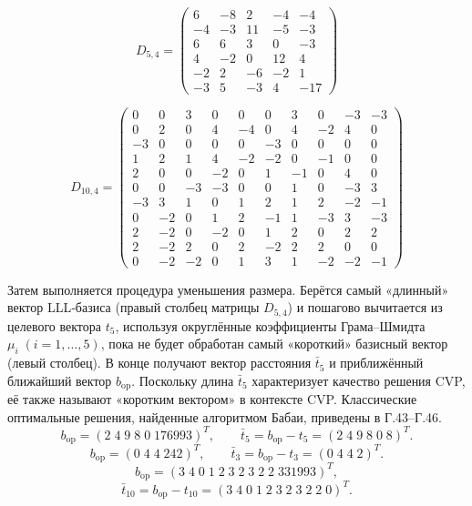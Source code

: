 \begin{equation}
D_{5,4} =
\begin{pmatrix}
  6 & -8 &  2 & -4 & -4 \\
 -4 & -3 & 11 & -5 & -3 \\
  6 &  6 &  3 &  0 & -3 \\
  4 & -2 &  0 & 12 &  4 \\
 -2 &  2 & -6 & -2 &  1 \\
 -3 &  5 & -3 &  4 & -17
\end{pmatrix}
\end{equation}

\begin{equation}
D_{10,4} =
\begin{pmatrix}
 0 &  0 &  3 &  0 &  0 &  0 &  3 &  0 & -3 & -3 \\
 0 &  2 &  0 &  4 & -4 &  0 &  4 & -2 &  4 &  0 \\
-3 &  0 &  0 &  0 &  0 & -3 &  0 &  0 &  0 &  0 \\
 1 &  2 &  1 &  4 & -2 & -2 &  0 & -1 &  0 &  0 \\
 2 &  0 &  0 & -2 &  0 &  1 & -1 &  0 &  4 &  0 \\
 0 &  0 & -3 & -3 &  0 &  0 &  1 &  0 & -3 &  3 \\
-3 &  3 &  1 &  0 &  1 &  2 &  1 &  2 & -2 & -1 \\
 0 & -2 &  0 &  1 &  2 & -1 &  1 & -3 &  3 & -3 \\
 2 & -2 &  0 & -2 &  0 &  1 &  2 &  0 &  2 &  2 \\
 2 & -2 &  2 &  0 &  2 & -2 &  2 &  2 &  0 &  0 \\
 0 & -2 & -2 &  0 &  1 &  3 &  1 & -2 & -2 & -1
\end{pmatrix}
\end{equation}

Затем выполняется процедура уменьшения размера. Берётся самый «длинный» вектор
LLL‑базиса (правый столбец матрицы \(D_{5,4}\)) и пошагово вычитается из
целевого вектора \(t_{5}\), используя округлённые коэффициенты Грама–Шмидта
\(\mu_{i}\;(i=1,\dots,5)\), пока не будет обработан самый «короткий» базисный
вектор (левый столбец). В конце получают вектор расстояния \(\bar t_{5}\) и
приближённый ближайший вектор \(b_{\mathrm{op}}\). Поскольку длина \(\bar
t_{5}\) характеризует качество решения CVP, её также называют «коротким
вектором» в контексте CVP. Классические оптимальные решения, найденные
алгоритмом Бабаи, приведены в Г.43–Г.46.
\begin{equation}
b_{\text{op}} =
(2\;4\;9\;8\;0\;176993)^{T},
\qquad
\bar t_{5}=b_{\text{op}}-t_{5}=
(2\;4\;9\;8\;0\;8)^{T}.
\end{equation}
\begin{equation}
b_{\text{op}} =
(0\;4\;4\;242)^{T},
\qquad
\bar t_{3}=b_{\text{op}}-t_{3}=
(0\;4\;4\;2)^{T}.
\end{equation}
\begin{equation}
b_{\text{op}} =
(3\;4\;0\;1\;2\;3\;2\;3\;2\;2\;331993)^{T},
\end{equation}
\begin{equation}
\bar t_{10}=b_{\text{op}}-t_{10}=
(3\;4\;0\;1\;2\;3\;2\;3\;2\;2\;0)^{T}.
\end{equation}

